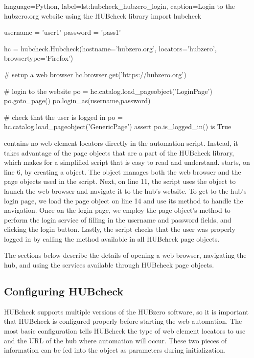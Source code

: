 \begin{xcode}{%
  language=Python,%
  label=lst:hubcheck_hubzero_login,%
  caption={Login to the hubzero.org website using the HUBcheck library}%
}
import hubcheck

username = 'user1'
password = 'pass1'

hc = hubcheck.Hubcheck(hostname='hubzero.org',
                       locators='hubzero',
                       browsertype='Firefox')

# setup a web browser
hc.browser.get('https://hubzero.org')

# login to the website
po = hc.catalog.load_pageobject('LoginPage')
po.goto_page()
po.login_as(username,password)

# check that the user is logged in
po = hc.catalog.load_pageobject('GenericPage')
assert po.is_logged_in() is True
\end{xcode}

 contains no web element locators
directly in the automation script. Instead, it takes advantage of the page
objects that are a part of the HUBcheck library, which makes for a simplified
script that is easy to read and understand.
 starts, on line 6, by creating a
 object.  The  object manages both the web
browser and the page objects used in the script. Next, on line 11, the script
uses the  object to launch the web browser and navigate it to
the hub's website. To get to the hub's login page, we load the
 page object on line 14 and use its 
method to handle the navigation. Once on the login page, we employ the page
object's  method to perform the login service of filling in
the username and password fields, and clicking the login button. Lastly, the
script checks that the user was properly logged in by calling the
 method available in all HUBcheck page objects.

The sections below describe the details of opening a web browser, navigating
the hub, and using the services available through HUBcheck page objects.

\subsection{Configuring HUBcheck}
\label{ssec:hubcheck_web_modules_configure}

HUBcheck supports multiple versions of the HUBzero software, so it is important
that HUBcheck is configured properly before starting the web automation. The
most basic configuration tells HUBcheck the type of web element locators to use
and the URL of the hub where automation will occur. These two pieces of
information can be fed into the  object as parameters during
initialization.

